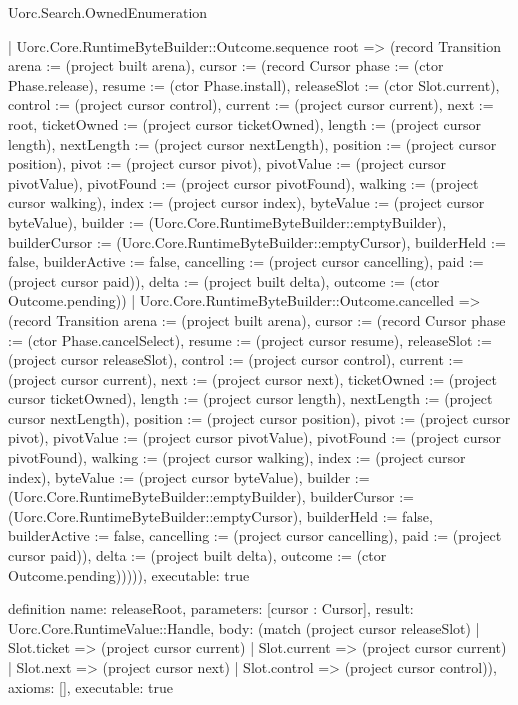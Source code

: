 \begin{lexlean}{Uorc.Search.OwnedEnumeration}
\begin{semanticmodule}
{      | Uorc.Core.RuntimeByteBuilder::Outcome.sequence root => (record Transition {arena := (project built arena), cursor := (record Cursor {phase := (ctor Phase.release), resume := (ctor Phase.install), releaseSlot := (ctor Slot.current), control := (project cursor control), current := (project cursor current), next := root, ticketOwned := (project cursor ticketOwned), length := (project cursor length), nextLength := (project cursor nextLength), position := (project cursor position), pivot := (project cursor pivot), pivotValue := (project cursor pivotValue), pivotFound := (project cursor pivotFound), walking := (project cursor walking), index := (project cursor index), byteValue := (project cursor byteValue), builder := (Uorc.Core.RuntimeByteBuilder::emptyBuilder), builderCursor := (Uorc.Core.RuntimeByteBuilder::emptyCursor), builderHeld := false, builderActive := false, cancelling := (project cursor cancelling), paid := (project cursor paid)}), delta := (project built delta), outcome := (ctor Outcome.pending)})
      | Uorc.Core.RuntimeByteBuilder::Outcome.cancelled => (record Transition {arena := (project built arena), cursor := (record Cursor {phase := (ctor Phase.cancelSelect), resume := (project cursor resume), releaseSlot := (project cursor releaseSlot), control := (project cursor control), current := (project cursor current), next := (project cursor next), ticketOwned := (project cursor ticketOwned), length := (project cursor length), nextLength := (project cursor nextLength), position := (project cursor position), pivot := (project cursor pivot), pivotValue := (project cursor pivotValue), pivotFound := (project cursor pivotFound), walking := (project cursor walking), index := (project cursor index), byteValue := (project cursor byteValue), builder := (Uorc.Core.RuntimeByteBuilder::emptyBuilder), builderCursor := (Uorc.Core.RuntimeByteBuilder::emptyCursor), builderHeld := false, builderActive := false, cancelling := (project cursor cancelling), paid := (project cursor paid)}), delta := (project built delta), outcome := (ctor Outcome.pending)})))),
  executable: true
}

definition{
  name: releaseRoot,
  parameters: [cursor : Cursor],
  result: Uorc.Core.RuntimeValue::Handle,
  body: (match (project cursor releaseSlot)
    | Slot.ticket => (project cursor current)
    | Slot.current => (project cursor current)
    | Slot.next => (project cursor next)
    | Slot.control => (project cursor control)),
  axioms: [],
  executable: true
}


\end{semanticmodule}
\end{lexlean}
